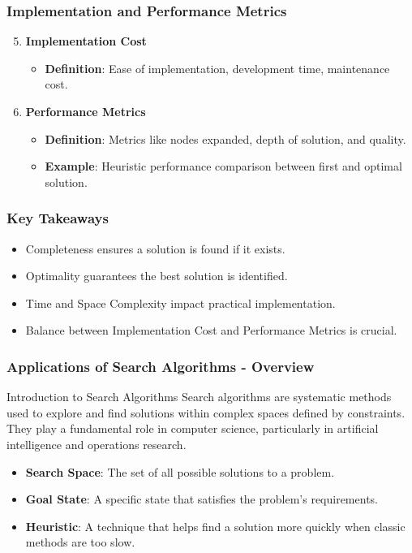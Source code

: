 \documentclass[aspectratio=169]{beamer}
\begin{document}
\begin{frame}[fragile]
    \frametitle{Implementation and Performance Metrics}
    \begin{enumerate}
        \setcounter{enumi}{4}
        \item \textbf{Implementation Cost}
            \begin{itemize}
                \item \textbf{Definition}: Ease of implementation, development time, maintenance cost.
            \end{itemize}
        \item \textbf{Performance Metrics}
            \begin{itemize}
                \item \textbf{Definition}: Metrics like nodes expanded, depth of solution, and quality.
                \item \textbf{Example}: Heuristic performance comparison between first and optimal solution.
            \end{itemize}
    \end{enumerate}
\end{frame}

\begin{frame}[fragile]
    \frametitle{Key Takeaways}
    \begin{itemize}
        \item Completeness ensures a solution is found if it exists.
        \item Optimality guarantees the best solution is identified.
        \item Time and Space Complexity impact practical implementation.
        \item Balance between Implementation Cost and Performance Metrics is crucial.
    \end{itemize}
\end{frame}

\begin{frame}[fragile]
    \frametitle{Applications of Search Algorithms - Overview}
    \begin{block}{Introduction to Search Algorithms}
        Search algorithms are systematic methods used to explore and find solutions within complex spaces defined by constraints. They play a fundamental role in computer science, particularly in artificial intelligence and operations research.
    \end{block}

    \begin{itemize}
        \item \textbf{Search Space}: The set of all possible solutions to a problem.
        \item \textbf{Goal State}: A specific state that satisfies the problem's requirements.
        \item \textbf{Heuristic}: A technique that helps find a solution more quickly when classic methods are too slow.
    \end{itemize}
\end{frame}
\end{document}
